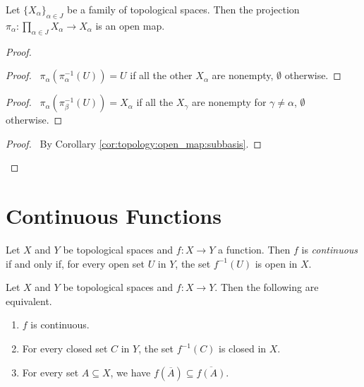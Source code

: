 \begin{lm}[AC]
  Let $\{X_\alpha\}_{\alpha \in J}$ be a family of topological spaces. Then
  the projection $\pi_\alpha : \prod_{\alpha \in J} X_\alpha \rightarrow
  X_\alpha$ is an open map.
\end{lm}

\begin{proof}
  \pf
  \begin{proof}
    \pf\ $\pi_\alpha(\pi_\alpha^{-1}(U)) = U$ if all the other $X_\alpha$ are
    nonempty, $\emptyset$ otherwise.
  \end{proof}
  \begin{proof}
    \pf\ $\pi_\alpha(\pi_\beta^{-1}(U)) = X_\alpha$ if all the $X_\gamma$ are
    nonempty for $\gamma \neq \alpha$, $\emptyset$ otherwise.
  \end{proof}
  \qedstep
  \begin{proof}
    \pf\ By Corollary \ref{cor:topology:open_map:subbasis}.
  \end{proof}
\end{proof}

\section{Continuous Functions}

\begin{df}[Continuous]
  Let $X$ and $Y$ be topological spaces and $f : X \rightarrow Y$ a function.
  Then $f$ is \emph{continuous} if and only if, for every open set $U$ in
  $Y$,
  the set $f^{-1}(U)$ is open in $X$.
\end{df}

\begin{thm}
  \label{thm:topology:continuous:characterisation}
  Let $X$ and $Y$ be topological spaces and $f : X \rightarrow Y$. Then the
  following are equivalent.
  \begin{enumerate}
    \item $f$ is continuous.
    \item For every closed set $C$ in $Y$, the set $f^{-1}(C)$ is closed in
    $X$.
    \item For every set $A \subseteq X$, we have $f(\overline{A}) \subseteq
    \overline{f(A)}$.
  \end{enumerate}
\end{thm}

